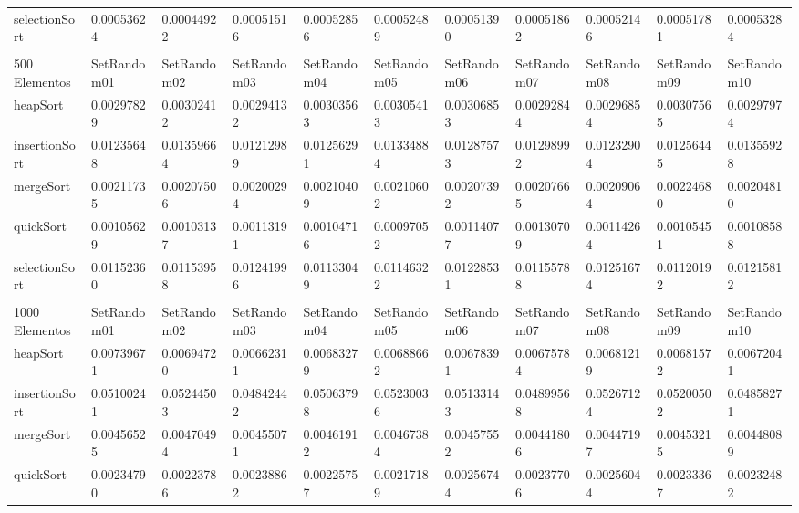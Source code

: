 \documentclass[article,a4paper]{article}
\begin{document}
\begin{table}[h]
{\begin{tabular}{lllllllllll}
selectionSort   & 0.00053624  & 0.00044922  & 0.00051516  & 0.00052856  & 0.00052489  & 0.00051390  & 0.00051862  & 0.00052146  & 0.00051781  & 0.00053284  \\
                &             &             &             &             &             &             &             &             &             &             \\
500 Elementos   & SetRandom01 & SetRandom02 & SetRandom03 & SetRandom04 & SetRandom05 & SetRandom06 & SetRandom07 & SetRandom08 & SetRandom09 & SetRandom10 \\
heapSort        & 0.00297829  & 0.00302412  & 0.00294132  & 0.00303563  & 0.00305413  & 0.00306853  & 0.00292844  & 0.00296854  & 0.00307565  & 0.00297974  \\
insertionSort   & 0.01235648  & 0.01359664  & 0.01212989  & 0.01256291  & 0.01334884  & 0.01287573  & 0.01298992  & 0.01232904  & 0.01256445  & 0.01355928  \\
mergeSort       & 0.00211735  & 0.00207506  & 0.00200294  & 0.00210409  & 0.00210602  & 0.00207392  & 0.00207665  & 0.00209064  & 0.00224680  & 0.00204810  \\
quickSort       & 0.00105629  & 0.00103137  & 0.00113191  & 0.00104716  & 0.00097052  & 0.00114077  & 0.00130709  & 0.00114264  & 0.00105451  & 0.00108588  \\
selectionSort   & 0.01152360  & 0.01153958  & 0.01241996  & 0.01133049  & 0.01146322  & 0.01228531  & 0.01155788  & 0.01251674  & 0.01120192  & 0.01215812  \\
                &             &             &             &             &             &             &             &             &             &             \\
1000 Elementos  & SetRandom01 & SetRandom02 & SetRandom03 & SetRandom04 & SetRandom05 & SetRandom06 & SetRandom07 & SetRandom08 & SetRandom09 & SetRandom10 \\
heapSort        & 0.00739671  & 0.00694720  & 0.00662311  & 0.00683279  & 0.00688662  & 0.00678391  & 0.00675784  & 0.00681219  & 0.00681572  & 0.00672041  \\
insertionSort   & 0.05100241  & 0.05244503  & 0.04842442  & 0.05063798  & 0.05230036  & 0.05133143  & 0.04899568  & 0.05267124  & 0.05200502  & 0.04858271  \\
mergeSort       & 0.00456525  & 0.00470494  & 0.00455071  & 0.00461912  & 0.00467384  & 0.00457552  & 0.00441806  & 0.00447197  & 0.00453215  & 0.00448089  \\
quickSort       & 0.00234790  & 0.00223786  & 0.00238862  & 0.00225757  & 0.00217189  & 0.00256744  & 0.00237706  & 0.00256044  & 0.00233367  & 0.00232482  \\

\end{tabular}}
\end{table}
\end{document}
